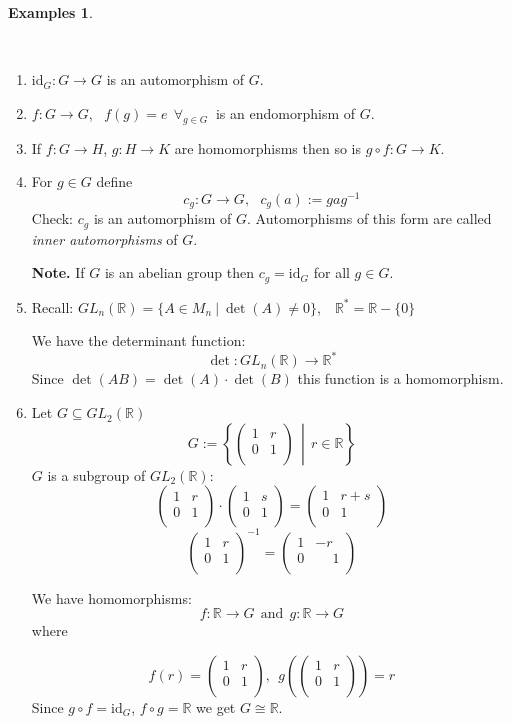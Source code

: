 \documentclass[12pt, letterpaper, oneside]{article}
\theoremstyle{plain}
\theoremstyle{definition}
\newtheorem{examples}[theorem]{Examples}
\newcommand{\R}{{\mathbb R}}
\newcommand{\id}{\mathrm{id}}
\newcommand{\bpm}{\begin{pmatrix}}
\newcommand{\epm}{\end{pmatrix}}
\newcommand{\msp}{\phantom{-}}
\begin{document}
\begin{examples}\ 

\vskip -13mm

\ 
\begin{enumerate}
\item $\id_{G}\colon G\to G$ is an automorphism of $G$.

\item $f\colon G\to G$, \ $f(g)=e\ \ \forall_{g\in G}\ $ is an endomorphism of $G$. 


\item If $f\colon G\to H$, $g\colon H \to K$ are homomorphisms then so is $g\circ f\colon G\to K$.

\item For $g\in G$ define 
$$c_{g}\colon G \to G, \ \ \ c_{g}(a) := gag^{-1}$$
Check: $c_{g}$ is an automorphism of $G$. Automorphisms of this form are called 
\emph{inner automorphisms} of $G$.  

\textbf{Note.} If $G$ is an abelian group then $c_{g}=\id_{G}$ for all $g\in G$.


\item Recall: $GL_{n}(\R) = \{ A\in M_{n} \ | \ \det(A)\neq 0 \}$,\ \ $\R^{\ast}= \R-\{0\}$

We have the determinant function:
$$\det \colon GL_{n}(\R) \to \R^{\ast}$$
Since $\det(AB)= \det(A)\cdot\det(B)$ this function is a homomorphism.

\item Let $G\subseteq GL_{2}(\R)$
$$G := \left\{ \left. \bpm 1 & r \\ 0 & 1 \\ \epm \ \ \right| \ \  r\in \R  \right\}$$
$G$ is a subgroup of $GL_{2}(\R)$:
$$
\bpm 1 & r \\ 0 & 1 \\ \epm\cdot \bpm 1 & s \\ 0 & 1 \\ \epm = \bpm 1 & r+s \\ 0 & 1 \\ \epm
$$
$$
\bpm 1 & r \\ 0 & 1 \\ \epm^{-1} = \bpm 1 & -r \\ 0 & \msp 1 \\ \epm $$

We have  homomorphisms:
$$f\colon \R \to G \ \ \text{and} \ \ g\colon \R \to G$$
where

$$f(r) = \bpm 1 & r \\ 0 & 1 \\ \epm, \ \ g\left( \bpm 1 & r \\ 0 & 1 \\ \epm\right) = r$$ 
Since $g\circ f = \id_{G}$, $f\circ g = \R$ we get $G\cong \R$.



\end{enumerate}
\end{examples}
\end{document}
